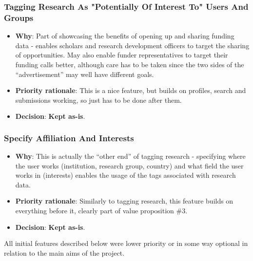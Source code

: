 \subsubsection{Tagging Research As "Potentially Of Interest To" Users And Groups}
\begin{itemize}
 \item \textbf{Why}: Part of showcasing the benefits of opening up and sharing funding data - enables scholars and research development officers to target the sharing of opportunities. May also enable funder representatives to target their funding calls better, although care has to be taken since the two sides of the ``advertisement'' may well have different goals.
 \item \textbf{Priority rationale}: This is a nice feature, but builds on profiles, search and submissions working, so just has to be done after them.
 \item \textbf{Decision}: \textbf{Kept as-is}.
\end{itemize}

\subsubsection{Specify Affiliation And Interests}
\begin{itemize}
 \item \textbf{Why}: This is actually the ``other end'' of tagging research - specifying where the user works (institution, research group, country) and what field the user works in (interests) enables the usage of the tags associated with research data.
 \item \textbf{Priority rationale}: Similarly to tagging research, this feature builds on everything before it, clearly part of value proposition \#3.
 \item \textbf{Decision}: \textbf{Kept as-is}.
\end{itemize}

All initial features described below were lower priority or in some way optional in relation to the main aims of the project.


